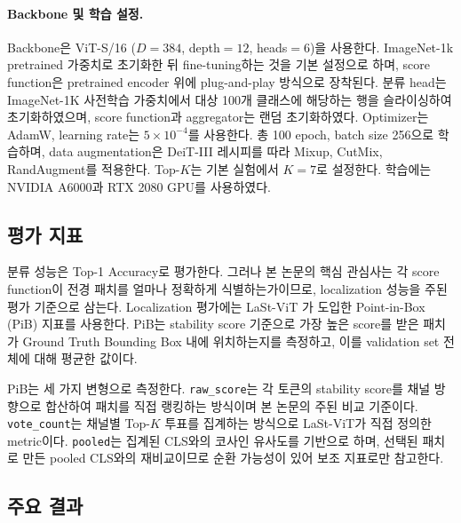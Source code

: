 \documentclass[10pt,twocolumn,letterpaper]{article}
\newcommand{\rawscore}{\texttt{raw\_score}}
\newcommand{\votecount}{\texttt{vote\_count}}
\newcommand{\pooled}{\texttt{pooled}}
\begin{document}
\paragraph{Backbone 및 학습 설정.}
Backbone은 ViT-S/16 ($D=384$, depth$=12$, heads$=6$)을 사용한다. ImageNet-1k pretrained 가중치로 초기화한 뒤 fine-tuning하는 것을 기본 설정으로 하며, score function은 pretrained encoder 위에 plug-and-play 방식으로 장착된다. 분류 head는 ImageNet-1K 사전학습 가중치에서 대상 100개 클래스에 해당하는 행을 슬라이싱하여 초기화하였으며, score function과 aggregator는 랜덤 초기화하였다. Optimizer는 AdamW, learning rate는 $5\times10^{-4}$를 사용한다. 총 100 epoch, batch size 256으로 학습하며, data augmentation은 DeiT-III \cite{touvron2022} 레시피를 따라 Mixup, CutMix, RandAugment를 적용한다. Top-$K$는 기본 실험에서 $K=7$로 설정한다. 학습에는 NVIDIA A6000과 RTX 2080 GPU를 사용하였다.

\subsection{평가 지표}

분류 성능은 Top-1 Accuracy로 평가한다. 그러나 본 논문의 핵심 관심사는 각 score function이 전경 패치를 얼마나 정확하게 식별하는가이므로, localization 성능을 주된 평가 기준으로 삼는다. Localization 평가에는 LaSt-ViT \cite{shi2026}가 도입한 Point-in-Box (PiB) 지표를 사용한다. PiB는 stability score 기준으로 가장 높은 score를 받은 패치가 Ground Truth Bounding Box 내에 위치하는지를 측정하고, 이를 validation set 전체에 대해 평균한 값이다.

PiB는 세 가지 변형으로 측정한다. \rawscore{}는 각 토큰의 stability score를 채널 방향으로 합산하여 패치를 직접 랭킹하는 방식이며 본 논문의 주된 비교 기준이다. \votecount{}는 채널별 Top-$K$ 투표를 집계하는 방식으로 LaSt-ViT가 직접 정의한 metric이다. \pooled{}는 집계된 CLS와의 코사인 유사도를 기반으로 하며, 선택된 패치로 만든 pooled CLS와의 재비교이므로 순환 가능성이 있어 보조 지표로만 참고한다.

\subsection{주요 결과}
\end{document}
